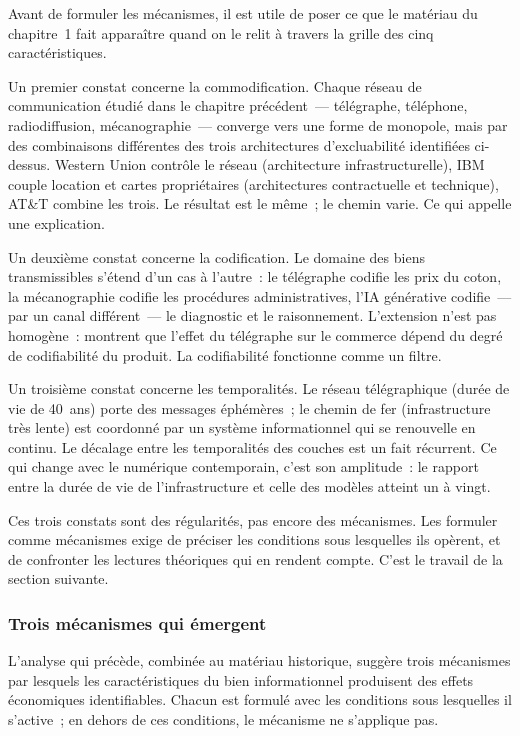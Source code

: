 Avant de formuler les mécanismes, il est utile de poser ce que le matériau du chapitre~1 fait apparaître quand on le relit à travers la grille des cinq caractéristiques.

Un premier constat concerne la commodification. Chaque réseau de communication étudié dans le chapitre précédent~--- télégraphe, téléphone, radiodiffusion, mécanographie~--- converge vers une forme de monopole, mais par des combinaisons différentes des trois architectures d'excluabilité identifiées ci-dessus. Western Union contrôle le réseau (architecture infrastructurelle), IBM couple location et cartes propriétaires (architectures contractuelle et technique), AT\&T combine les trois. Le résultat est le même~; le chemin varie. Ce qui appelle une explication.

Un deuxième constat concerne la codification. Le domaine des biens transmissibles s'étend d'un cas à l'autre~: le télégraphe codifie les prix du coton, la mécanographie codifie les procédures administratives, l'IA générative codifie~--- par un canal différent~--- le diagnostic et le raisonnement. L'extension n'est pas homogène~: \textcite{juhasz_spinning_2018} montrent que l'effet du télégraphe sur le commerce dépend du degré de codifiabilité du produit. La codifiabilité fonctionne comme un filtre.

Un troisième constat concerne les temporalités. Le réseau télégraphique (durée de vie de 40~ans) porte des messages éphémères~; le chemin de fer (infrastructure très lente) est coordonné par un système informationnel qui se renouvelle en continu. Le décalage entre les temporalités des couches est un fait récurrent. Ce qui change avec le numérique contemporain, c'est son amplitude~: le rapport entre la durée de vie de l'infrastructure et celle des modèles atteint un à vingt.

Ces trois constats sont des régularités, pas encore des mécanismes. Les formuler comme mécanismes exige de préciser les conditions sous lesquelles ils opèrent, et de confronter les lectures théoriques qui en rendent compte. C'est le travail de la section suivante.


\subsubsection{Trois mécanismes qui émergent}

L'analyse qui précède, combinée au matériau historique, suggère trois mécanismes par lesquels les caractéristiques du bien informationnel produisent des effets économiques identifiables. Chacun est formulé avec les conditions sous lesquelles il s'active~; en dehors de ces conditions, le mécanisme ne s'applique pas.

